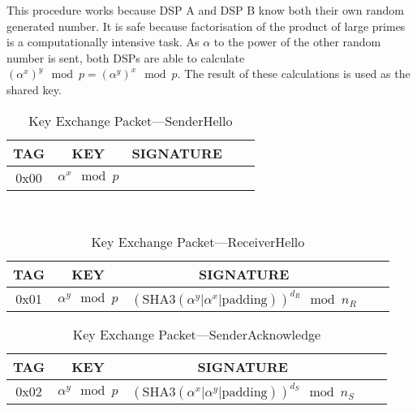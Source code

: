 \documentclass[a4paper]{article}
\begin{document}
This procedure works because DSP A and DSP B know both their own random generated number. It is safe because factorisation of the product of large primes is a computationally intensive task. As $\alpha$ to the power of the other random number is sent, both DSPs are able to calculate $\left(\alpha^{x}\right)^{y}\mod{p} = \left(\alpha^{y}\right)^{x}\mod{p}$. The result of these calculations is used as the shared key.

\begin{table}[H]
    \begin{center}
        \begin{tabular}{| c | c | c | c | c |}
            \hline
            TAG & KEY & SIGNATURE \\ \hline
            0x00 & $\alpha^x\mod{p}$ & \\
            \hline
        \end{tabular}
    \end{center}
    \
    \caption{Key Exchange Packet---SenderHello}
    \label{tab:key_exchange_packet_senderhello}
\end{table}
\begin{table}[H]
    \begin{center}
        \begin{tabular}{| c | c | c | c | c |}
            \hline
            TAG & KEY & SIGNATURE \\ \hline
            0x01 & $\alpha^y\mod{p}$ & $\left(\text{SHA3}\left(\alpha^y \big| \alpha^x \big| \text{padding} \right)\right)^{d_R}\mod{n_R}$\\
            \hline
        \end{tabular}
    \end{center}
    
    \caption{Key Exchange Packet---ReceiverHello}
    \label{tab:key_exchange_packet_receiverhello}
\end{table}
\begin{table}[H]
    \begin{center}
        \begin{tabular}{| c | c | c | c | c |}
            \hline
            TAG & KEY & SIGNATURE \\ \hline
            0x02 & $\alpha^y\mod{p}$ & $\left(\text{SHA3}\left(\alpha^x \big| \alpha^y \big| \text{padding} \right)\right)^{d_S}\mod{n_S}$\\
            \hline
        \end{tabular}
    \end{center}
    
    \caption{Key Exchange Packet---SenderAcknowledge}
    \label{tab:key_exchange_packet_senderacknowledge}
\end{table}
\end{document}
